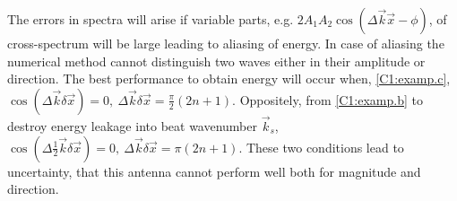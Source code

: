 The errors in spectra will arise if variable parts, e.g. $2A_1A_2 \cos(\Delta \vec{k} \vec{x} - \phi)$,  of cross-spectrum will be large leading to aliasing of energy. In case of aliasing the numerical method cannot distinguish two waves either in their amplitude or direction. The best performance to obtain energy will occur when, \eqref{C1:examp.c}, $\cos (\Delta \vec{k} \delta \vec{x}) = 0,~\Delta \vec{k} \delta \vec{x} = \frac{\pi}{2} (2n + 1)$. Oppositely, from \eqref{C1:examp.b} to destroy energy leakage into beat wavenumber $\vec{k}_s$, $\cos (\Delta \frac{1}{2}\vec{k} \delta \vec{x}) = 0,~\Delta \vec{k} \delta \vec{x} = \pi(2n + 1)$. These two conditions lead to uncertainty, that this antenna cannot perform well both for magnitude and direction. 

